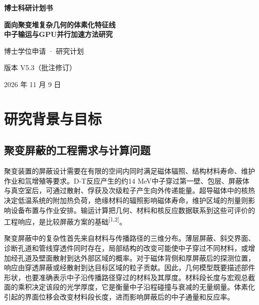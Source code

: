 \documentclass[UTF8, zihao=-4, fontset=none, a4paper]{ctexart}
\newcommand{\upcite}[1]{\textsuperscript{[#1]}}
\begin{document}
\begin{titlepage}
  \centering
  \vspace*{2.4cm}
  {\bfseries 博士科研计划书\par}
  \vspace{1.6cm}
  {\bfseries 面向聚变堆复杂几何的体素化特征线\\[0.6ex]
   中子输运与GPU并行加速方法研究\par}
  \vspace{2.4cm}
  { 博士学位申请 · 研究计划\par}
  \vspace{6cm}
  { 版本 V5.3（批注修订）\par}
  \vspace{0.6ex}
  { 2026 年 11 月 9 日\par}
  \vfill
\end{titlepage}

\begingroup
\linespread{1.05}\selectfont
\setlength{\parskip}{0pt}
\tableofcontents
\endgroup
\clearpage

\setcounter{page}{1}




\section{研究背景与目标}\label{sec:1}

\subsection{聚变屏蔽的工程需求与计算问题}

聚变装置的屏蔽设计需要在有限的空间内同时满足磁体辐照、结构材料寿命、维护作业和氚增殖等要求。D-T反应产生的约14 MeV中子穿过第一壁、包层、屏蔽体与真空室后，可通过散射、俘获及次级粒子产生向外传递能量。超导磁体中的核热决定低温系统的附加热负荷，绝缘材料的辐照影响磁体寿命，维护区域的剂量则影响设备布置与作业安排。输运计算把几何、材料和核反应数据联系到这些可评价的工程响应，是比较屏蔽方案的基础\upcite{1,2}。

聚变屏蔽中的复杂性首先来自材料与传播路径的三维分布。薄层屏蔽、斜交界面、诊断孔道和管线穿透件同时存在，局部结构的改变可能使中子穿过不同材料，或增加经孔道及壁面散射到达外部区域的概率。对于磁体背侧和厚屏蔽后的探测位置，响应由穿透屏蔽或经散射到达目标区域的粒子贡献。因此，几何模型既要描述部件形状，也要准确表示中子沿传播路径穿过的材料及其厚度。材料段长度与宏观总截面的乘积决定该段的光学厚度，它是衡量中子沿程碰撞与衰减的无量纲量。体素化引起的界面位移会改变材料段长度，进而影响屏蔽后的中子通量和反应率。
\end{document}
